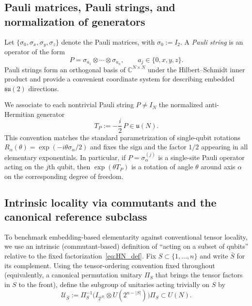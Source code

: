 \documentclass{article}%
\theoremstyle{definition}
\numberwithin{equation}{section}
\begin{document}
\subsection{Pauli matrices, Pauli strings, and normalization of generators}
\label{subsec:pauli_strings}
Let $\{\sigma_0,\sigma_x,\sigma_y,\sigma_z\}$ denote the Pauli matrices, with $\sigma_0:=I_2$.
A \emph{Pauli string} is an operator of the form
\begin{equation}\label{eq:pauli_string}
P=\sigma_{a_1}\otimes\cdots\otimes\sigma_{a_n},\qquad a_j\in\{0,x,y,z\}.
\end{equation}
Pauli strings form an orthogonal basis of $\mathbb{C}^{N\times N}$ under the Hilbert--Schmidt inner
product and provide a convenient coordinate system for describing embedded $\mathfrak{su}(2)$
directions.

We associate to each nontrivial Pauli string $P\neq I_N$ the normalized anti-Hermitian generator
\begin{equation}\label{eq:PauliGenerator}
T_P := -\frac{i}{2}\,P \in \mathfrak{u}(N).
\end{equation}
This convention matches the standard parametrization of single-qubit rotations
$R_\alpha(\theta)=\exp(-i\theta\sigma_\alpha/2)$ and fixes the sign and the factor $1/2$ appearing in
all elementary exponentials. In particular, if $P=\sigma_\alpha^{(j)}$ is a single-site Pauli
operator acting on the $j$th qubit, then $\exp(\theta T_P)$ is a rotation of angle $\theta$ around
axis $\alpha$ on the corresponding degree of freedom.


\subsection{Intrinsic locality via commutants and the canonical reference subclass}
\label{subsec:intrinsic_locality}
To benchmark embedding-based elementarity against conventional tensor locality, we use an intrinsic
(commutant-based) definition of ``acting on a subset of qubits'' relative to the fixed
factorization~\eqref{eq:HN_def}. Fix $S\subset\{1,\dots,n\}$ and write $\bar S$ for its complement.
Using the tensor-ordering convention fixed throughout (equivalently, a canonical permutation unitary
$\Pi_S$ that brings the tensor factors in $S$ to the front), define the subgroup of unitaries acting
trivially on $S$ by
\begin{equation}\label{eq:Ubar_def}
\mathcal{U}_{\bar S}:=\Pi_S^{-1}\big(I_{2^{|S|}}\otimes U(2^{n-|S|})\big)\Pi_S \subset U(N).
\end{equation}
\end{document}

